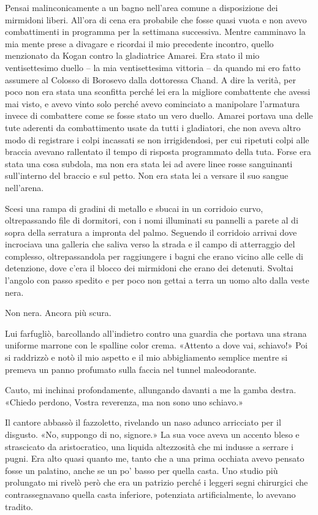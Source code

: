 Pensai malinconicamente a un bagno nell'area comune a disposizione dei
mirmidoni liberi. All'ora di cena era probabile che fosse quasi vuota e
non avevo combattimenti in programma per la settimana successiva. Mentre
camminavo la mia mente prese a divagare e ricordai il mio precedente
incontro, quello menzionato da Kogan contro la gladiatrice Amarei. Era
stato il mio ventisettesimo duello -- la mia ventisettesima vittoria --
da quando mi ero fatto assumere al Colosso di Borosevo dalla dottoressa
Chand. A dire la verità, per poco non era stata una sconfitta perché lei
era la migliore combattente che avessi mai visto, e avevo vinto solo
perché avevo cominciato a manipolare l'armatura invece di combattere
come se fosse stato un vero duello. Amarei portava una delle tute
aderenti da combattimento usate da tutti i gladiatori, che non aveva
altro modo di registrare i colpi incassati se non irrigidendosi, per cui
ripetuti colpi alle braccia avevano rallentato il tempo di risposta
programmato della tuta. Forse era stata una cosa subdola, ma non era
stata lei ad avere linee rosse sanguinanti sull'interno del braccio e
sul petto. Non era stata lei a versare il suo sangue nell'arena.

Scesi una rampa di gradini di metallo e sbucai in un corridoio curvo,
oltrepassando file di dormitori, con i nomi illuminati su pannelli a
parete al di sopra della serratura a impronta del palmo. Seguendo il
corridoio arrivai dove incrociava una galleria che {saliva} verso la
strada e il campo di atterraggio del complesso, oltrepassandola per
raggiungere i bagni che erano vicino alle celle di detenzione, dove
c'era il blocco dei mirmidoni che erano dei detenuti. Svoltai l'angolo
con passo spedito e per poco non gettai a terra un uomo alto dalla veste
nera.

Non nera. Ancora più scura.

Lui farfugliò, barcollando all'indietro contro una guardia che portava
una strana uniforme marrone con le spalline color crema. «Attento a dove
vai, schiavo!» Poi si raddrizzò e notò il mio aspetto e il mio
abbigliamento semplice mentre si premeva un panno profumato sulla faccia
nel tunnel maleodorante.

Cauto, mi inchinai profondamente, allungando davanti a me la gamba
destra. «Chiedo perdono, Vostra reverenza, ma non sono uno schiavo.»

Il cantore abbassò il fazzoletto, rivelando un naso adunco arricciato
per il disgusto. «No, suppongo di no, signore.» La sua voce aveva un
accento bleso e strascicato da aristocratico, una liquida altezzosità
che mi indusse a serrare i pugni. Era alto quasi quanto me, tanto che a
una prima occhiata avevo pensato fosse un palatino, anche se un po'
basso per quella casta. Uno studio più prolungato mi rivelò però che era
un patrizio perché i leggeri segni chirurgici che contrassegnavano
quella casta inferiore, potenziata artificialmente, lo avevano tradito.

